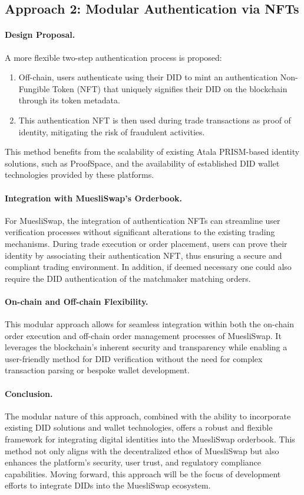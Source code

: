 \documentclass[11pt]{article}
\begin{document}
\subsection{Approach 2: Modular Authentication via NFTs}

\paragraph{Design Proposal.} A more flexible two-step authentication process is proposed:
\begin{enumerate}
\item Off-chain, users authenticate using their DID to mint an authentication Non-Fungible Token (NFT) that uniquely signifies their DID on the blockchain through its token metadata.
\item This authentication NFT is then used during trade transactions as proof of identity, mitigating the risk of fraudulent activities.
\end{enumerate}
This method benefits from the scalability of existing Atala PRISM-based identity solutions, such as ProofSpace, and the availability of established DID wallet technologies provided by these platforms.

\paragraph{Integration with MuesliSwap's Orderbook.} For MuesliSwap, the integration of authentication NFTs can streamline user verification processes without significant alterations to the existing trading mechanisms. During trade execution or order placement, users can prove their identity by associating their authentication NFT, thus ensuring a secure and compliant trading environment. In addition, if deemed necessary one could also require the DID authentication of the matchmaker matching orders. 

\paragraph{On-chain and Off-chain Flexibility.} This modular approach allows for seamless integration within both the on-chain order execution and off-chain order management processes of MuesliSwap. It leverages the blockchain's inherent security and transparency while enabling a user-friendly method for DID verification without the need for complex transaction parsing or bespoke wallet development.

\paragraph{Conclusion.} The modular nature of this approach, combined with the ability to incorporate existing DID solutions and wallet technologies, offers a robust and flexible framework for integrating digital identities into the MuesliSwap orderbook. This method not only aligns with the decentralized ethos of MuesliSwap but also enhances the platform's security, user trust, and regulatory compliance capabilities. Moving forward, this approach will be the focus of development efforts to integrate DIDs into the MuesliSwap ecosystem.
\end{document}
